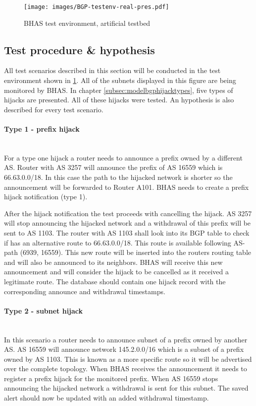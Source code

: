 \begin{figure}[h]
\centering
\hspace*{-2.5cm}
\texttt{[image: images/BGP-testenv-real-pres.pdf]}
\vspace*{-1cm}
\caption{BHAS test environment, artificial testbed}
\label{fig:testenvironmentrealplain}
\end{figure}

\subsection{Test procedure \& hypothesis}\label{subsec:testprocedure}
All test scenarios described in this section will be conducted in the test environment shown in \ref{fig:testenvironmentrealplain}. All of the subnets displayed in this figure are being monitored by BHAS. In chapter \ref{subsec:modelbgphijacktypes}, five types of hijacks are presented. All of these hijacks were tested. An hypothesis is also described for every test scenario.

\paragraph{Type 1 - prefix hijack}\label{par:prefix}\mbox{}\\
For a type one hijack a router needs to announce a prefix owned by a different AS. Router with AS 3257 will announce the prefix of AS 16559 which is 66.63.0.0/18. In this case the path to the hijacked network is shorter so the announcement will be forwarded to Router A101. BHAS needs to create a prefix hijack notification (type 1).\par

After the hijack notification the test proceeds with cancelling the hijack. AS 3257 will stop announcing the hijacked network and a withdrawal of this prefix will be sent to AS 1103. The router with AS 1103 shall look into its BGP table to check if has an alternative route to 66.63.0.0/18. This route is available following AS-path (6939, 16559). This new route will be inserted into the routers routing table and will also be announced to its neighbors. BHAS will receive this new announcement and will consider the hijack to be cancelled as it received a legitimate route. The database should contain one hijack record with the corresponding announce and withdrawal timestamps.

\paragraph{Type 2 - subnet hijack}\label{par:subnet}\mbox{}\\
In this scenario a router needs to announce subnet of a prefix owned by another AS. AS 16559 will announce network 145.2.0.0/16 which is a subnet of a prefix owned by AS 1103. This is known as a more specific route so it will be advertised over the complete topology. When BHAS receives the announcement it needs to register a prefix hijack for the monitored prefix. When AS 16559 stops announcing the hijacked network a withdrawal is sent for this subnet. The saved alert should now be updated with an added withdrawal timestamp.

